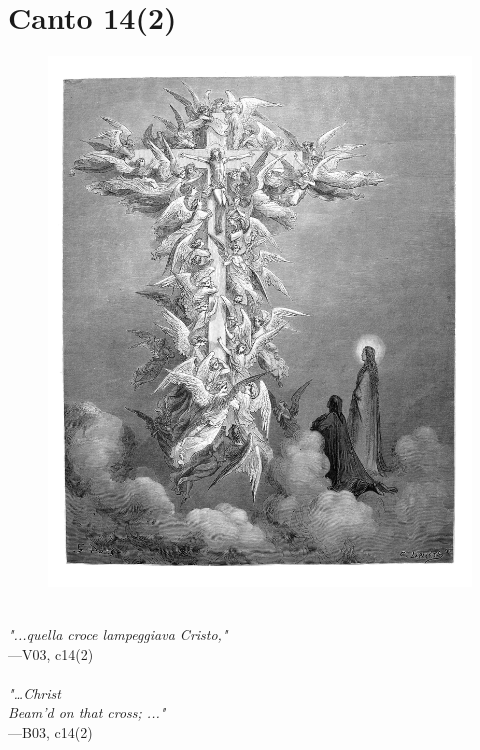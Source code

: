 \documentclass[../Dore_vision.tex]{subfiles}
\begin{document}
\newpage

\section{Canto 14(2)}

\begin{figure}[ht]
\centering
\includegraphics[height=\figsize]{illustrations/book_3/V03, c14(2).jpg}
\end{figure}

\begin{center}
\begin{minipage}{0.8\linewidth}
\textit{\\
"...quella croce lampeggiava Cristo,"} \\
—V03, c14(2) \\~\\
\textit{"…Christ\\Beam'd on that cross; ..."} \\
—B03, c14(2)
\end{minipage}
\end{center}
\end{document}

